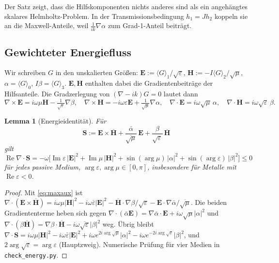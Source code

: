 \documentclass[11pt, a4paper]{article}
\newcommand{\mvec}[1]{\boldsymbol{#1}}
\newcommand{\grade}[2]{\langle #1\rangle_{#2}}
\theoremstyle{plain}
\newtheorem{lemma}[satz]{Lemma}
\theoremstyle{definition}
\newcommand{\status}[1]{\hfill{\small\sffamily[#1]}}
\begin{document}
Der Satz zeigt, dass die Hilfskomponenten nichts anderes sind als ein
angehängtes skalares Helmholtz-Problem. In der Transmissionsbedingung $h_1 =
Jh_2$ koppeln sie an die Maxwell-Anteile, weil $\frac{1}{ik}\nabla\alpha$ zum
Grad-1-Anteil beiträgt.

\subsection{Gewichteter Energiefluss}

Wir schreiben $G$ in den unskalierten Größen: $\mvec{E} := \grade{G}{1}/\sqrt\varepsilon$,
$\mvec{H} := -I\grade{G}{2}/\sqrt\mu$, $\alpha = \grade{G}{0}$, $I\beta = \grade{G}{3}$.
$\mvec{E},\mvec{H}$ enthalten dabei die Gradientenbeiträge der Hilfsanteile. Die
Gradzerlegung von $(\nabla-ik)G=0$ lautet dann
\begin{equation}\label{eq:maxaux}
  \nabla\times\mvec{E} = i\omega\mu\mvec{H} - \tfrac{1}{\sqrt\varepsilon}\nabla\beta,\quad
  \nabla\times\mvec{H} = -i\omega\varepsilon\mvec{E} + \tfrac{1}{\sqrt\mu}\nabla\alpha,\quad
  \nabla\cdot\mvec{E} = i\omega\sqrt\mu\,\alpha,\quad
  \nabla\cdot\mvec{H} = i\omega\sqrt\varepsilon\,\beta .
\end{equation}

\begin{lemma}[Energieidentität]\label{lem:energie}\status{bewiesen, num.\ verif.}
Für
\[
  \mvec{S} := \mvec{E}\times\overline{\mvec{H}}
  + \frac{\bar\alpha}{\overline{\sqrt\mu}}\,\mvec{E}
  + \frac{\beta}{\sqrt\varepsilon}\,\overline{\mvec{H}}
\]
gilt
\[
  \operatorname{Re}\nabla\cdot\mvec{S} = -\omega\Big[
  \operatorname{Im}\varepsilon\,|\mvec{E}|^2 + \operatorname{Im}\mu\,|\mvec{H}|^2
  + \sin(\arg\mu)\,|\alpha|^2 + \sin(\arg\varepsilon)\,|\beta|^2\Big] \le 0
\]
für jedes passive Medium, $\arg\varepsilon,\arg\mu\in[0,\pi]$, insbesondere für
Metalle mit $\operatorname{Re}\varepsilon<0$.
\end{lemma}
\begin{proof}
Mit \eqref{eq:maxaux} ist
$\nabla\cdot(\mvec{E}\times\overline{\mvec{H}}) = i\omega\mu|\mvec{H}|^2 - i\omega\bar\varepsilon|\mvec{E}|^2
- \overline{\mvec{H}}\cdot\nabla\beta/\sqrt\varepsilon - \mvec{E}\cdot\nabla\bar\alpha/\overline{\sqrt\mu}$.
Die beiden Gradiententerme heben sich gegen
$\nabla\cdot(\bar\alpha\mvec{E}) = \nabla\bar\alpha\cdot\mvec{E} + i\omega\sqrt\mu|\alpha|^2$
und $\nabla\cdot(\beta\overline{\mvec{H}}) = \nabla\beta\cdot\overline{\mvec{H}} -
i\omega\overline{\sqrt\varepsilon}|\beta|^2$ weg. Übrig bleibt
$\nabla\cdot\mvec{S} = i\omega\mu|\mvec{H}|^2 - i\omega\bar\varepsilon|\mvec{E}|^2 +
i\omega e^{2i\arg\sqrt\mu}|\alpha|^2 - i\omega e^{-2i\arg\sqrt\varepsilon}|\beta|^2$, und
$2\arg\sqrt\varepsilon = \arg\varepsilon$ (Hauptzweig). Numerische Prüfung für vier
Medien in \texttt{check\_energy.py}.
\end{proof}
\end{document}
